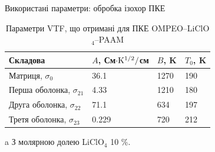 \documentclass[10pt]{beamer}
\begin{document}
\begin{frame}{Використані параметри: обробка ізохор ПКЕ}
\footnotesize

\begin{table}[tb]
	\centering
	\begin{threeparttable} 
	\caption{\label{tab:temp} Параметри VTF, що отримані для ПКЕ OMPEO--LiClO$_4$--PAAM }
		\begin{tabular}{|l|l|l|l|}
			\hline
			\textrm{Складова}   & $A$, См$\cdot \rm{K}^{1/2}/$см & $B$, K & $T_0$, K  \\
			\hline
			Матриця, $\sigma_0$           &  36.1\tnote{a}  &  1270  &  190   \\
			Перша оболонка, $\sigma_{21}$   &  4.33  &  1210   &  180    \\
			Друга оболонка, $\sigma_{22}$  &  71.1   &  634     &  197   \\
			Третя оболонка, $\sigma_{23}$   & 0.229   &  720   &  212 \\
			\hline
		\end{tabular}
		\begin{tablenotes}
			\item[a] З молярною долею LiClO$_4$ 10 \%.
		\end{tablenotes}
	\end{threeparttable}
\end{table}

\end{frame}
\end{document}

